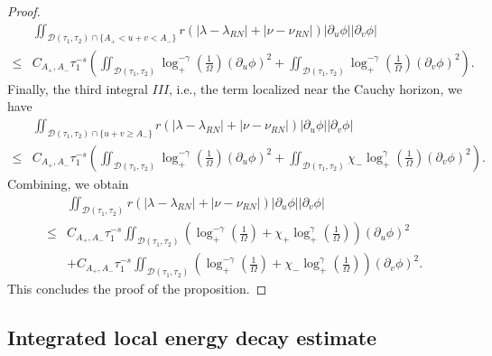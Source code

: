 \documentclass[10pt, reqno]{amsart}
\theoremstyle{definition}
\theoremstyle{remark}
\numberwithin{equation}{section}
\newcommand{\rd}{\partial}
\newcommand{\0}{\emptyset}
\newcommand{\lmb}{\lambda}
\newcommand{\Omg}{\Omega}
\newcommand{\calD}{\mathcal D}
\newcommand{\dur}{\nu}
\newcommand{\dvr}{\lmb}
\newcommand{\f}{\frac}
\begin{document}
\begin{proof}
\begin{equation*}
\begin{split}
&\iint_{\calD(\tau_{1}, \tau_{2})\cap\{A_+<u+v< A_-\}} r(|\dvr-\dvr_{RN}|+|\dur-\dur_{RN}| )|\rd_u\phi||\rd_v\phi|\\
\leq &C_{A_+,A_-}\tau_1^{-s}\left(\iint_{\calD(\tau_{1}, \tau_{2})} \log_+^{-\gamma}(\f{1}{\Omg})(\rd_u\phi)^2+\iint_{\calD(\tau_{1}, \tau_{2})} \log_+^{-\gamma}(\f{1}{\Omg})(\rd_v\phi)^2\right).
\end{split}
\end{equation*}
Finally, the third integral $III$, i.e., the term localized near the Cauchy horizon, we have 
\begin{equation*}
\begin{split}
&\iint_{\calD(\tau_{1}, \tau_{2})\cap\{u+v\geq A_-\}} r(|\dvr-\dvr_{RN}|+|\dur-\dur_{RN}| )|\rd_u\phi||\rd_v\phi|\\
\leq &C_{A_+,A_-}\tau_1^{-s}\left(\iint_{\calD(\tau_{1}, \tau_{2})} \log_+^{-\gamma}(\f{1}{\Omg})(\rd_u\phi)^2+\iint_{\calD(\tau_{1}, \tau_{2})} \chi_-\log_+^\gamma(\f{1}{\Omg})(\rd_v\phi)^2\right).
\end{split}
\end{equation*}
Combining, we obtain
\begin{equation}\label{intr.cross.bulk}
\begin{split}
&\iint_{\calD(\tau_{1}, \tau_{2})} r(|\dvr-\dvr_{RN}|+|\dur-\dur_{RN}| )|\rd_u\phi||\rd_v\phi|\\
\leq &C_{A_+,A_-}\tau_1^{-s}\iint_{\calD(\tau_{1}, \tau_{2})} \left( \log_+^{-\gamma}(\f{1}{\Omg})+\chi_+\log_+^{\gamma}(\f{1}{\Omg}) \right)(\rd_u\phi)^2\\
	&+C_{A_+,A_-}\tau_1^{-s}\iint_{\calD(\tau_{1}, \tau_{2})} \left( \log_+^{-\gamma}(\f{1}{\Omg})+\chi_-\log_+^{\gamma}(\f{1}{\Omg}) \right)(\rd_v\phi)^2.
\end{split}
\end{equation}
This concludes the proof of the proposition.
\end{proof}

\subsection{Integrated local energy decay estimate}\label{sec.ILED}
\end{document}
